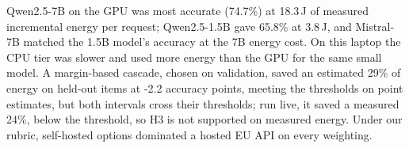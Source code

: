 Qwen2.5-7B on the GPU was most accurate (74.7\%) at 18.3\,J of measured incremental energy per request; Qwen2.5-1.5B gave 65.8\% at 3.8\,J, and Mistral-7B matched the 1.5B model's accuracy at the 7B energy cost. On this laptop the CPU tier was slower and used more energy than the GPU for the same small model. A margin-based cascade, chosen on validation, saved an estimated 29\% of energy on held-out items at -2.2 accuracy points, meeting the thresholds on point estimates, but both intervals cross their thresholds; run live, it saved a measured 24\%, below the threshold, so H3 is not supported on measured energy. Under our rubric, self-hosted options dominated a hosted EU API on every weighting.%
